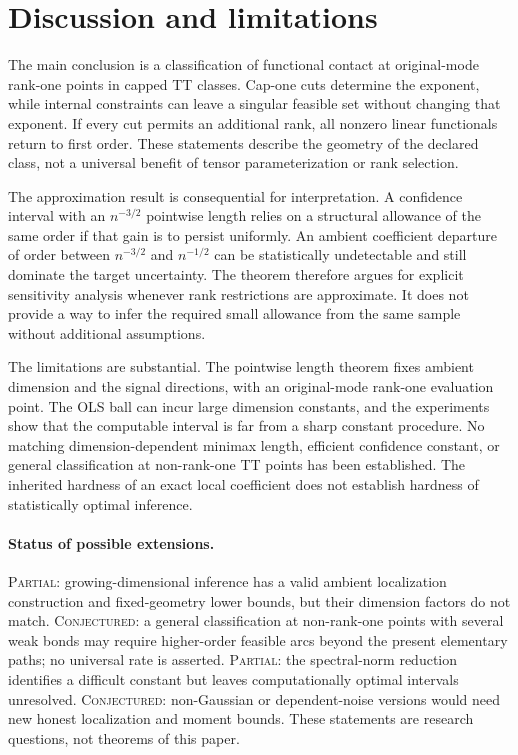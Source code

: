 \section{Discussion and limitations}
The main conclusion is a classification of functional contact at original-mode rank-one points in capped TT classes. Cap-one cuts determine the exponent, while internal constraints can leave a singular feasible set without changing that exponent. If every cut permits an additional rank, all nonzero linear functionals return to first order. These statements describe the geometry of the declared class, not a universal benefit of tensor parameterization or rank selection.

The approximation result is consequential for interpretation. A confidence interval with an $n^{-3/2}$ pointwise length relies on a structural allowance of the same order if that gain is to persist uniformly. An ambient coefficient departure of order between $n^{-3/2}$ and $n^{-1/2}$ can be statistically undetectable and still dominate the target uncertainty. The theorem therefore argues for explicit sensitivity analysis whenever rank restrictions are approximate. It does not provide a way to infer the required small allowance from the same sample without additional assumptions.

The limitations are substantial. The pointwise length theorem fixes ambient dimension and the signal directions, with an original-mode rank-one evaluation point. The OLS ball can incur large dimension constants, and the experiments show that the computable interval is far from a sharp constant procedure. No matching dimension-dependent minimax length, efficient confidence constant, or general classification at non-rank-one TT points has been established. The inherited hardness of an exact local coefficient does not establish hardness of statistically optimal inference.

\paragraph{Status of possible extensions.}
\textsc{Partial}: growing-dimensional inference has a valid ambient localization construction and fixed-geometry lower bounds, but their dimension factors do not match. \textsc{Conjectured}: a general classification at non-rank-one points with several weak bonds may require higher-order feasible arcs beyond the present elementary paths; no universal rate is asserted. \textsc{Partial}: the spectral-norm reduction identifies a difficult constant but leaves computationally optimal intervals unresolved. \textsc{Conjectured}: non-Gaussian or dependent-noise versions would need new honest localization and moment bounds. These statements are research questions, not theorems of this paper.

